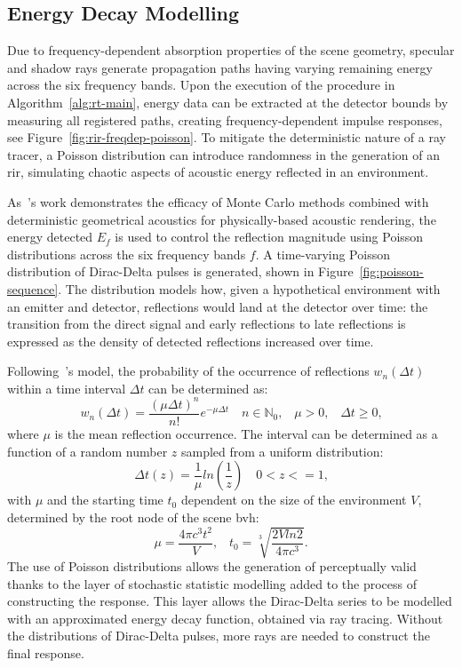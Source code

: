 \subsection{Energy Decay Modelling}
Due to frequency-dependent absorption properties of the scene geometry, specular and shadow rays generate propagation paths having varying remaining energy across the six frequency bands. Upon the execution of the procedure in Algorithm~\ref{alg:rt-main}, energy data can be extracted at the detector bounds by measuring all registered paths, creating frequency-dependent impulse responses, see Figure~\ref{fig:rir-freqdep-poisson}. To mitigate the deterministic nature of a ray tracer, a Poisson distribution can introduce randomness in the generation of an \acrshort{rir}, simulating chaotic aspects of acoustic energy reflected in an environment. \par
As~\cite{schroder2011physically}'s work demonstrates the efficacy of Monte Carlo methods combined with deterministic geometrical acoustics for physically-based acoustic rendering, the energy detected $E_f$ is used to control the reflection magnitude using Poisson distributions across the six frequency bands $f$. A time-varying Poisson distribution of Dirac-Delta pulses is generated, shown in Figure~\ref{fig:poisson-sequence}. The distribution models how, given a hypothetical environment with an emitter and detector, reflections would land at the detector over time: the transition from the direct signal and early reflections to late reflections is expressed as the density of detected reflections increased over time.\par
Following~\cite{schroder2011physically}'s model, the probability of the occurrence of reflections $w_n(\Delta t)$ within a time interval $\Delta t$ can be determined as:
\begin{equation}\label{eq:poisson-distributed-diracs}
    w_n(\Delta t) = \frac{(\mu \Delta t)^n}{n!} e^{-\mu \Delta t} \quad n \in \mathbb{N}_0\textrm{,} \quad \mu > 0\textrm{,} \quad \Delta t \ge 0\textrm{,}
\end{equation}
where $\mu$ is the mean reflection occurrence. The interval can be determined as a function of a random number $z$ sampled from a uniform distribution: 
\begin{equation}
    \Delta t(z) = \frac{1}{\mu}ln(\frac{1}{z}) \quad 0 < z <= 1\textrm{,}
\end{equation}
with $\mu$ and the starting time $t_0$ dependent on the size of the environment $V$, determined by the root node of the scene \acrshort{bvh}: 
\begin{equation}
    \mu = \frac{4\pi c^3 t^2}{V}\textrm{,} \quad t_0 = \sqrt[3]{\frac{2Vln2}{4\pi c^3}}\textrm{.}
\end{equation}
The use of Poisson distributions allows the generation of perceptually valid  thanks to the layer of stochastic statistic modelling added to the process of constructing the response. This layer allows the Dirac-Delta series to be modelled with an approximated energy decay function, obtained via ray tracing. Without the distributions of Dirac-Delta pulses, more rays are needed to construct the final response.

